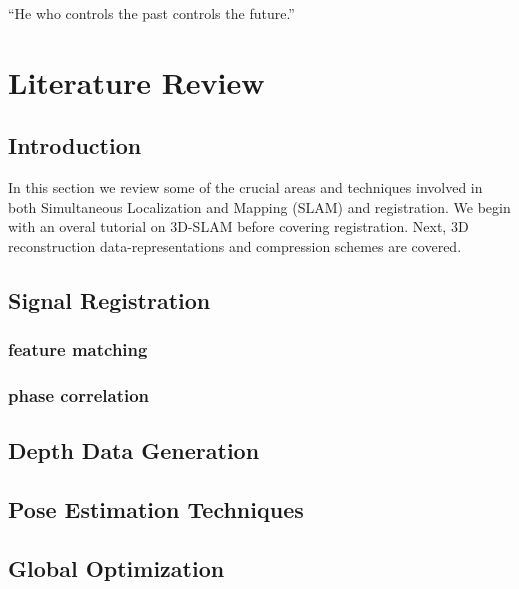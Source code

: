 \begin{savequote}[8cm]
  ``He who controls the past controls the future.''
\end{savequote}
\makeatletter
\chapter{Literature Review}

\section{Introduction}

In this section we review some of the crucial areas and techniques involved in both Simultaneous Localization and Mapping (SLAM) and registration. We begin with an overal tutorial on 3D-SLAM before covering registration. Next, 3D reconstruction data-representations and compression schemes are covered. 


\section{Signal Registration}
\subsection{feature matching}

\subsection{phase correlation}


\section{Depth Data Generation}

\section{Pose Estimation Techniques}

\section{Global Optimization}



